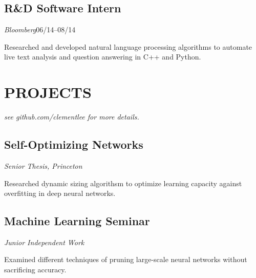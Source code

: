 \documentclass[11pt]{article}
\begin{document}
\begin{minipage}[t]{0.55\textwidth}
  \medskip
  \subsection*{R\&D Software Intern}
  \emph{Bloomberg}\hfill 06/14--08/14
  \smallskip

  Researched and developed natural language processing algorithms to automate live text analysis and question answering in C++ and Python.

  \bigskip
  \section*{\LARGE PROJECTS}
  \emph{see github.com/clementlee for more details.}
  
  \medskip
  \subsection*{Self-Optimizing Networks}
  \emph{Senior Thesis, Princeton}
  \smallskip

  Researched dynamic sizing algorithsm to optimize learning capacity against overfitting in deep neural networks.

  \medskip
  \subsection*{Machine Learning Seminar}
  \emph{Junior Independent Work}
  \smallskip

  Examined different techniques of pruning large-scale neural networks without sacrificing accuracy.
  

  
\end{minipage}
\end{document}
